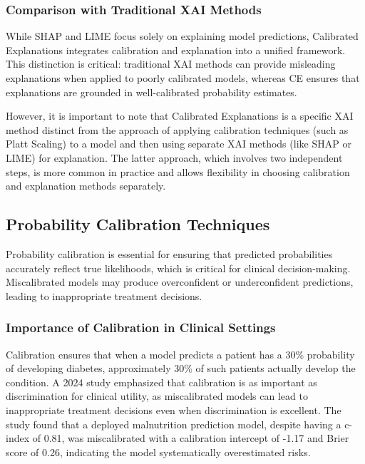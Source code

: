 \subsubsection{Comparison with Traditional XAI Methods}

While SHAP and LIME focus solely on explaining model predictions, Calibrated Explanations integrates calibration and explanation into a unified framework. This distinction is critical: traditional XAI methods can provide misleading explanations when applied to poorly calibrated models, whereas CE ensures that explanations are grounded in well-calibrated probability estimates.

However, it is important to note that Calibrated Explanations is a specific XAI method distinct from the approach of applying calibration techniques (such as Platt Scaling) to a model and then using separate XAI methods (like SHAP or LIME) for explanation. The latter approach, which involves two independent steps, is more common in practice and allows flexibility in choosing calibration and explanation methods separately.

\subsection{Probability Calibration Techniques}

Probability calibration is essential for ensuring that predicted probabilities accurately reflect true likelihoods, which is critical for clinical decision-making. Miscalibrated models may produce overconfident or underconfident predictions, leading to inappropriate treatment decisions.

\subsubsection{Importance of Calibration in Clinical Settings}

Calibration ensures that when a model predicts a patient has a 30\% probability of developing diabetes, approximately 30\% of such patients actually develop the condition. A 2024 study emphasized that calibration is as important as discrimination for clinical utility, as miscalibrated models can lead to inappropriate treatment decisions even when discrimination is excellent. The study found that a deployed malnutrition prediction model, despite having a c-index of 0.81, was miscalibrated with a calibration intercept of -1.17 and Brier score of 0.26, indicating the model systematically overestimated risks.

